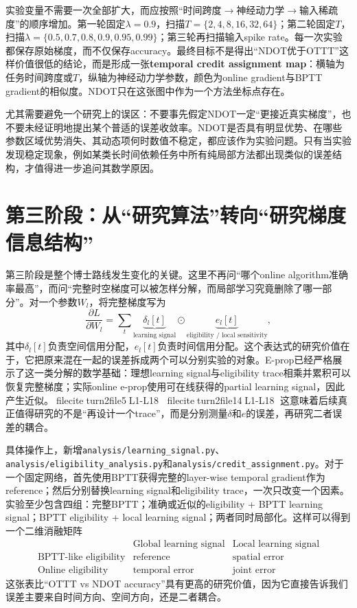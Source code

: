 \documentclass[journal,12pt,onecolumn]{IEEEtran}
\begin{document}
实验变量不需要一次全部扩大，而应按照“时间跨度$\rightarrow$神经动力学$\rightarrow$输入稀疏度”的顺序增加。第一轮固定$\lambda=0.9$，扫描$T=\{2,4,8,16,32,64\}$；第二轮固定$T$，扫描$\lambda=\{0.5,0.7,0.8,0.9,0.95,0.99\}$；第三轮再扫描输入spike rate。每一次实验都保存原始梯度，而不仅保存accuracy。最终目标不是得出“NDOT优于OTTT”这样价值很低的结论，而是形成一张\textbf{temporal credit assignment map}：横轴为任务时间跨度或$T$，纵轴为神经动力学参数，颜色为online gradient与BPTT gradient的相似度。NDOT只在这张图中作为一个方法坐标点存在。

尤其需要避免一个研究上的误区：不要事先假定NDOT一定“更接近真实梯度”，也不要未经证明地提出某个普适的误差收敛率。NDOT是否具有明显优势、在哪些参数区域优势消失、其动态项何时数值不稳定，都应该作为实验问题。只有当实验发现稳定现象，例如某类长时间依赖任务中所有纯局部方法都出现类似的误差结构，才值得进一步追问其数学原因。

\section{第三阶段：从“研究算法”转向“研究梯度信息结构”}

第三阶段是整个博士路线发生变化的关键。这里不再问“哪个online algorithm准确率最高”，而问“完整时空梯度可以被怎样分解，而局部学习究竟删除了哪一部分”。对一个参数$W_l$，将完整梯度写为
\begin{equation}
\frac{\partial L}{\partial W_l}
=
\sum_t
\underbrace{\delta_l[t]}_{\text{learning signal}}
\odot
\underbrace{e_l[t]}_{\text{eligibility / local sensitivity}},
\end{equation}
其中$\delta_l[t]$负责空间信用分配，$e_l[t]$负责时间信用分配。这个表达式的研究价值在于，它把原来混在一起的误差拆成两个可以分别实验的对象。E-prop已经严格展示了这一类分解的数学基础：理想learning signal与eligibility trace相乘并累积可以恢复完整梯度；实际online e-prop使用可在线获得的partial learning signal，因此产生近似。fileciteturn2file5L1-L18 fileciteturn2file14L1-L18 这意味着后续真正值得研究的不是“再设计一个trace”，而是分别测量$\delta$和$e$的误差，再研究二者误差的耦合。

具体操作上，新增\verb|analysis/learning_signal.py|、\verb|analysis/eligibility_analysis.py|和\verb|analysis/credit_assignment.py|。对于一个固定网络，首先使用BPTT获得完整的layer-wise temporal gradient作为reference；然后分别替换learning signal和eligibility trace，一次只改变一个因素。实验至少包含四组：完整BPTT；准确或近似的eligibility + BPTT learning signal；BPTT eligibility + local learning signal；两者同时局部化。这样可以得到一个二维消融矩阵
\begin{equation}
\begin{array}{c|cc}
 & \text{Global learning signal} & \text{Local learning signal}\\
\hline
\text{BPTT-like eligibility} & \text{reference} & \text{spatial error}\\
\text{Online eligibility} & \text{temporal error} & \text{joint error}
\end{array}
\end{equation}
这张表比“OTTT vs NDOT accuracy”具有更高的研究价值，因为它直接告诉我们误差主要来自时间方向、空间方向，还是二者耦合。
\end{document}

